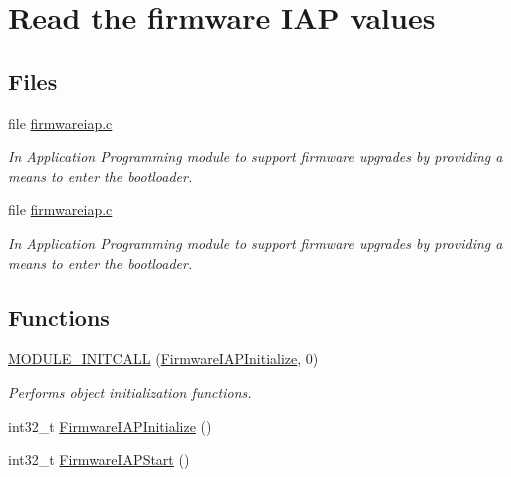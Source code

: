 \hypertarget{group___firmware_i_a_p_module}{\section{\-Read the firmware \-I\-A\-P values}
\label{group___firmware_i_a_p_module}
}
\subsection*{\-Files}
\begin{DoxyCompactItemize}
\item 
file \hyperlink{firmwareiap_8c}{firmwareiap.\-c}
\begin{DoxyCompactList}\small\item\em \-In \-Application \-Programming module to support firmware upgrades by providing a means to enter the bootloader. \end{DoxyCompactList}\item 
file \hyperlink{firmwareiap_8c}{firmwareiap.\-c}
\begin{DoxyCompactList}\small\item\em \-In \-Application \-Programming module to support firmware upgrades by providing a means to enter the bootloader. \end{DoxyCompactList}\end{DoxyCompactItemize}
\subsection*{\-Functions}
\begin{DoxyCompactItemize}
\item 
\hyperlink{group___firmware_i_a_p_module_ga1b486408efd08ae19fd2ef378a05d37f}{\-M\-O\-D\-U\-L\-E\-\_\-\-I\-N\-I\-T\-C\-A\-L\-L} (\hyperlink{group___firmware_i_a_p_module_ga61e65cd331a8694161b769f35fa95d74}{\-Firmware\-I\-A\-P\-Initialize}, 0)
\begin{DoxyCompactList}\small\item\em \-Performs object initialization functions. \end{DoxyCompactList}\item 
int32\-\_\-t \hyperlink{group___firmware_i_a_p_module_ga61e65cd331a8694161b769f35fa95d74}{\-Firmware\-I\-A\-P\-Initialize} ()
\item 
int32\-\_\-t \hyperlink{group___firmware_i_a_p_module_ga2d3301503424edc14d7c6169b467e9e2}{\-Firmware\-I\-A\-P\-Start} ()
\end{DoxyCompactItemize}
